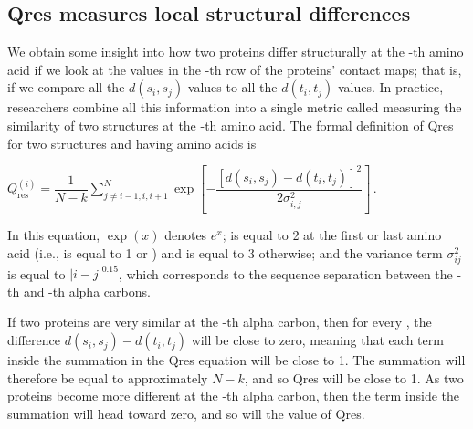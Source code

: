 \subsection{Qres measures local structural differences}

We obtain some insight into how two proteins differ structurally at the -th amino acid if we look at the values in the -th row of the proteins' contact maps; that is, if we compare all the $d(s_{i}, s_{j})$ values to all the $d(t_{i}, t_{j})$ values. In practice, researchers combine all this information into a single metric called  measuring the similarity of two structures at the -th amino acid. The formal definition of Qres for two structures  and  having  amino acids is

\begin{center}
$Q_{\text{res}}^{(i)} = \dfrac{1}{N-k} \displaystyle \sum^{N}_{j\neq i-1,i,i+1} \exp\left[-\dfrac{[d(s_i,s_j)-d(t_i,t_j)]^2}{2\sigma^2_{i,j}}\right]$\,.
\end{center}

\noindent In this equation, $\exp(x)$ denotes $e^{x}$;  is equal to 2 at the first or last amino acid (i.e.,  is equal to 1 or ) and is equal to 3 otherwise; and the variance term $\sigma_{ij}^2$ is equal to $\left\lvert{i-j}\right\rvert ^{0.15}$, which corresponds to the sequence separation between the -th and -th alpha carbons.\\

\begin{note}\end{note}

If two proteins are very similar at the -th alpha carbon, then for every , the difference $d(s_{i}, s_{j}) - d(t_{i}, t_{j})$ will be close to zero, meaning that each term inside the summation in the Qres equation will be close to 1. The summation will therefore be equal to approximately $N - k$, and so Qres will be close to 1. As two proteins become more different at the -th alpha carbon, then the term inside the summation will head toward zero, and so will the value of Qres.

